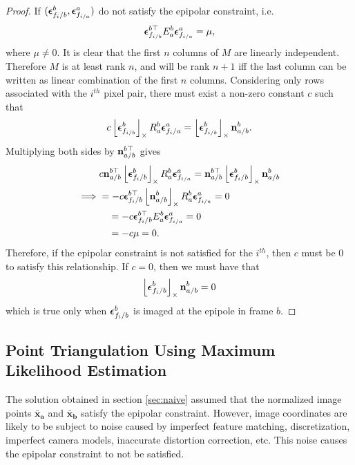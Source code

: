 	\begin{proof}
		If $(\boldsymbol{\epsilon}_{f_i/b}^b, \boldsymbol{\epsilon}_{f_{i/a}}^a)$ do not satisfy the epipolar constraint, i.e.
		\[
		\boldsymbol{\epsilon}_{f_{i/b}}^{b\top} E_{a}^b \boldsymbol{\epsilon}_{f_{i/a}}^a = \mu, 
		\]
		where $\mu \neq 0$.  It is clear that the first $n$ columns of $M$ are linearly independent.  Therefore $M$ is at least rank $n$, and will be rank $n+1$ iff the last column can be written as linear combination of the first $n$ columns.  		
		 Considering only rows associated with the $i^{th}$ pixel pair,  there must exist a non-zero constant $c$ such that 
		\[
		c \left\lfloor\boldsymbol{\epsilon}_{f_{i/b}}^b\right\rfloor_{\times} R_a^b \boldsymbol{\epsilon}_{{f_i}/a}^a = \left\lfloor\boldsymbol{\epsilon}_{f_{i/b}}^b\right\rfloor_{\times} \mathbf{n}_{a/b}^b.
		\]
		Multiplying both sides by $\mathbf{n}_{a/b}^{b\top}$ gives
		\begin{align*}
		&c \mathbf{n}_{a/b}^{b\top} \left\lfloor\boldsymbol{\epsilon}_{f_i/b}^b\right\rfloor_{\times} R_a^b \boldsymbol{\epsilon}_{f_{i/a}}^a = \mathbf{n}_{a/b}^{b\top}\left\lfloor\boldsymbol{\epsilon}_{f_i/b}^b\right\rfloor_{\times} \mathbf{n}_{a/b}^b \\
		\implies & = -c \boldsymbol{\epsilon}_{f_i/b}^{b\top} \left\lfloor\mathbf{n}_{a/b}^{b}\right\rfloor_{\times} R_a^b \boldsymbol{\epsilon}_{f_{i/a}}^a = 0 \\
		&\quad = -c \boldsymbol{\epsilon}_{f_i/b}^{b\top} E_a^b \boldsymbol{\epsilon}_{f_{i/a}}^a = 0  \\
		&\quad = -c \mu = 0.
		\end{align*}
		Therefore, if the epipolar constraint is not satisfied for the $i^{th}$, then $c$ must be 0 to satisfy this relationship. 
		If $c=0$, then we must have that
		\[
		\left\lfloor\boldsymbol{\epsilon}_{f_i/b}^b\right\rfloor_{\times} \mathbf{n}_{a/b}^b = 0
		\]
		which is true only when $\boldsymbol{\epsilon}_{f_i/b}^b$ is imaged at the epipole in frame $b$. 		
	\end{proof}
		
	
	\subsection{Point Triangulation Using Maximum Likelihood Estimation}
	\label{sec:mle_triang}
	
	
	The solution obtained in section \ref{sec:naive} assumed that the normalized image points $\mathbf{\bar{x}_a}$ and $\mathbf{\bar{x}_b}$ satisfy the epipolar constraint. However, image coordinates are likely to be subject to noise caused by imperfect feature matching, discretization, imperfect camera models, inaccurate distortion correction, etc. This noise causes the epipolar constraint to not be satisfied. 
	
